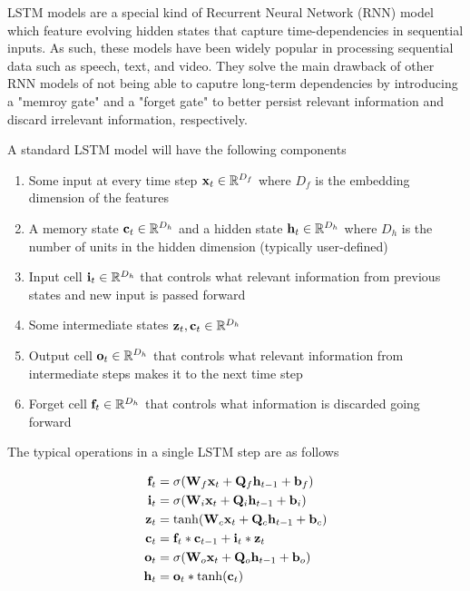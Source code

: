
LSTM models are a special kind of Recurrent Neural Network (RNN) model which feature evolving hidden states that capture time-dependencies in sequential inputs. As such, these models have been widely popular in processing sequential data such as speech, text, and video. They solve the main drawback of other RNN models of not being able to caputre long-term dependencies by introducing a "memroy gate" and a "forget gate" to better persist relevant information and discard irrelevant information, respectively. 

A standard LSTM model will have the following components

\begin{enumerate}
	\item Some input at every time step $\mVector{x}_t \in \R^{D_f}$ where $D_f$ is the embedding dimension of the features
	\item A memory state $\mVector{c}_t \in \R^{D_h}$ and a hidden state $\mVector{h}_t \in \R^{D_h}$ where $D_h$ is the number of units in the hidden dimension (typically user-defined)
	\item Input cell $\mVector{i}_t \in \R^{D_h}$ that controls what relevant information from previous states and new input is passed forward
	\item Some intermediate states $\mVector{z}_t, \mVector{c}_t \in \R^{D_h}$
	\item Output cell $\mVector{o}_t \in \R^{D_h}$ that controls what relevant information from intermediate steps makes it to the next time step
	\item Forget cell $\mVector{f}_t \in \R^{D_h}$ that controls what information is discarded going forward
\end{enumerate}

The typical operations in a single LSTM step are as follows

\begin{align*}
\mVector{f}_t & = \sigma(\mVector{W}_f\mVector{x}_t + \mVector{Q}_f\mVector{h}_{t-1} + \mVector{b}_f) \\
\mVector{i}_t & = \sigma(\mVector{W}_i\mVector{x}_t + \mVector{Q}_i\mVector{h}_{t-1} + \mVector{b}_i) \\
\mVector{z}_t & = \tanh(\mVector{W}_c\mVector{x}_t + \mVector{Q}_c\mVector{h}_{t-1} + \mVector{b}_c) \\
\mVector{c}_t & = \mVector{f}_t * \mVector{c}_{t-1} + \mVector{i}_t * \mVector{z}_t \\
\mVector{o}_t & = \sigma(\mVector{W}_o\mVector{x}_t + \mVector{Q}_o\mVector{h}_{t-1} + \mVector{b}_o) \\
\mVector{h}_t & = \mVector{o}_t * \tanh(\mVector{c}_t)
\end{align*}

